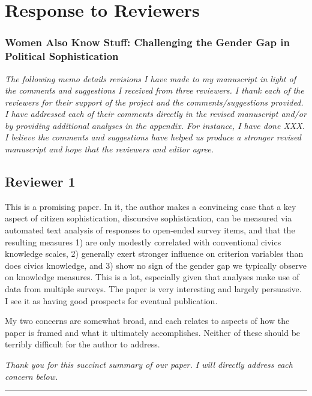 \clearpage
\singlespacing
\setcounter{page}{1}
\setlength{\parskip}{1em}
\setlength{\parindent}{0cm}
\section*{Response to Reviewers}
\subsubsection*{Women Also Know Stuff: Challenging the Gender Gap in Political Sophistication}
\startcontents[memo]

\textit{The following memo details revisions I have made to my manuscript in light of the comments and suggestions I received from three reviewers.  I thank each of the reviewers for their support of the project and the comments/suggestions provided. I have addressed each of their comments directly in the revised manuscript and/or by providing additional analyses in the appendix.  For instance, I have done XXX. I believe the comments and suggestions have helped us produce a stronger revised manuscript and hope that the reviewers and editor agree.}


\subsection*{Reviewer 1}

This is a promising paper. In it, the author makes a convincing case that a key aspect of citizen sophistication, discursive sophistication, can be measured via automated text analysis of responses to open-ended survey items, and that the resulting measures 1) are only modestly correlated with conventional civics knowledge scales, 2) generally exert stronger influence on criterion variables than does civics knowledge, and 3) show no sign of the gender gap we typically observe on knowledge measures. This is a lot, especially given that analyses make use of data from multiple surveys. The paper is very interesting and largely persuasive. I see it as having good prospects for eventual publication.

My two concerns are somewhat broad, and each relates to aspects of how the paper is framed and what it ultimately accomplishes. Neither of these should be terribly difficult for the author to address.

\textit{Thank you for this succinct summary of our paper. I will directly address each concern below.}

\rule{\linewidth}{.01cm}

